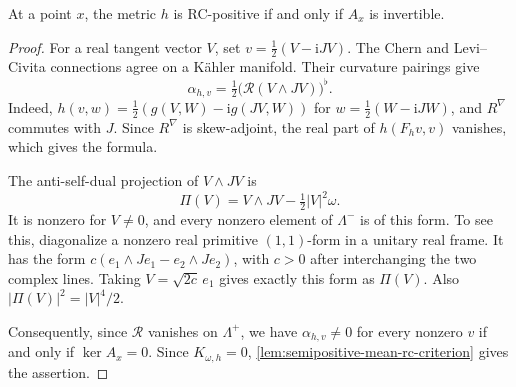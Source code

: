 \begin{lemma}\label{lem:ricci-flat-rc-invertibility}
At a point $x$, the metric $h$ is RC-positive if and only if $A_x$ is invertible.
\end{lemma}
\begin{proof}
For a real tangent vector $V$, set $v=\tfrac12(V-\mathrm iJV)$. The Chern and Levi--Civita connections agree on a K\"ahler manifold. Their curvature pairings give
\[
 \alpha_{h,v}=\tfrac12\bigl(\mathscr R(V\wedge JV)\bigr)^\flat.
\]
Indeed, $h(v,w)=\tfrac12(g(V,W)-\mathrm i g(JV,W))$ for $w=\tfrac12(W-\mathrm iJW)$, and $R^\nabla$ commutes with $J$. Since $R^\nabla$ is skew-adjoint, the real part of $h(F_hv,v)$ vanishes, which gives the formula.

The anti-self-dual projection of $V\wedge JV$ is
\[
 \Pi(V)=V\wedge JV-\tfrac12|V|^2\omega.
\]
It is nonzero for $V\ne0$, and every nonzero element of $\Lambda^-$ is of this form. To see this, diagonalize a nonzero real primitive $(1,1)$-form in a unitary real frame. It has the form $c(e_1\wedge Je_1-e_2\wedge Je_2)$, with $c>0$ after interchanging the two complex lines. Taking $V=\sqrt{2c}\,e_1$ gives exactly this form as $\Pi(V)$. Also $|\Pi(V)|^2=|V|^4/2$.

Consequently, since $\mathscr R$ vanishes on $\Lambda^+$, we have $\alpha_{h,v}\ne0$ for every nonzero $v$ if and only if $\ker A_x=0$. Since $K_{\omega,h}=0$, \cref{lem:semipositive-mean-rc-criterion} gives the assertion.
\end{proof}

